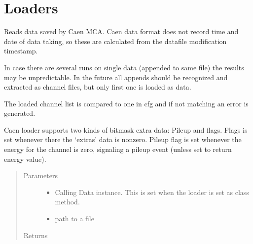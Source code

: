 \documentclass[letterpaper,10pt,english]{sphinxmanual}
\begin{document}
\section{Loaders}
\label{\detokenize{autodocs/loaders:module-listmode.loaders}}\label{\detokenize{autodocs/loaders:loaders}}\label{\detokenize{autodocs/loaders::doc}}

\begin{fulllineitems}
\label{\detokenize{autodocs/loaders:listmode.loaders.caen_loader}}
\sphinxAtStartPar
Reads data saved by Caen MCA. Caen data format does not record time and date of data taking, so these are calculated
from the datafile modification timestamp.

\sphinxAtStartPar
In case there are several runs on single data (appended to same file) the results may be unpredictable. In the
future all appends should be recognized and extracted as channel files, but only first one is loaded as data.

\sphinxAtStartPar
The loaded channel list is compared to one in cfg and if not matching an error is generated.

\sphinxAtStartPar
Caen loader supports two kinds of bitmask extra data: Pileup and flags. Flags is set whenever there the ‘extras’
data is nonzero. Pileup flag is set whenever the energy for the channel is zero, signaling a pileup event (unless
set to return energy value).
\begin{quote}\begin{description}
\item[{Parameters}] \leavevmode\begin{itemize}
\item {} 
\sphinxAtStartPar
{} \textendash{} Calling Data instance. This is set when the loader is set as class method.

\item {} 
\sphinxAtStartPar
{} \textendash{} path to a file

\end{itemize}

\item[{Returns}] \leavevmode
\sphinxAtStartPar


\end{description}\end{quote}

\end{fulllineitems}
\end{document}
